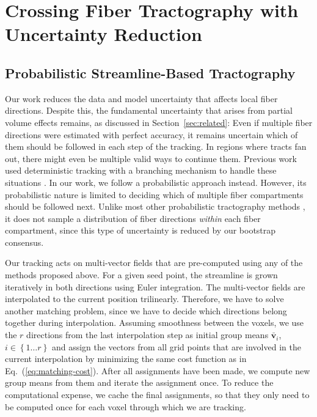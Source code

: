 \section{Crossing Fiber Tractography with Uncertainty Reduction}
\label{sec:tracking}
\subsection{Probabilistic Streamline-Based Tractography}

Our work reduces the data and model uncertainty that affects local fiber directions. Despite this, the fundamental uncertainty that arises from partial volume effects remains, as discussed in Section~\ref{sec:related}: Even if multiple fiber directions were estimated with perfect accuracy, it remains  uncertain which of them should be followed in each step of the tracking. In regions where tracts fan out, there might even be multiple valid ways to continue them. Previous work used deterministic tracking with a branching mechanism to handle these situations \cite{Ankele:CARS2017}. In our work, we follow a probabilistic approach instead. However, its probabilistic nature is limited to deciding which of multiple fiber compartments should be followed next. Unlike most other probabilistic tractography methods \cite{BEHRENS2007144,Jones:2008}, it does not sample a distribution of fiber directions \emph{within} each fiber compartment, since this type of uncertainty is reduced by our bootstrap consensus.

Our tracking acts on multi-vector fields that are pre-computed using any of the methods proposed above. For a given seed point, the streamline is grown iteratively in both directions using Euler
integration. The multi-vector fields are interpolated to the current position trilinearly. Therefore,
we have to solve another matching problem, since we have to decide which
directions belong together during interpolation. Assuming
smoothness between the voxels, we use the $r$ directions from the last
interpolation step as initial group means $\bar{\mathbf{v}}_i$, $i \in \left\{ 1\dots r 
\right\}$ and assign the vectors from all grid points that are involved in the current interpolation by minimizing the same cost function as in Eq.~(\ref{eq:matching-cost}). After all assignments have been made, we compute new group means from them and iterate the assignment once. To reduce the computational expense, we cache the final assignments, so that they only need to be computed once for each voxel through which we are tracking.

